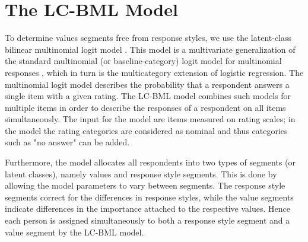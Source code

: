 \documentclass[12pt,letter]{article}\usepackage[]{graphicx}\usepackage[]{xcolor}
\begin{document}
\section*{The LC-BML Model}

To determine values segments free from response styles, we use the latent-class bilinear multinomial logit model \citep[LC-BML model;][]{vanrosmalen2010}. This model is a multivariate generalization of the standard multinomial (or baseline-category) logit model for multinomial responses \citep[e.g.][]{agresti2002}, which in turn is the multicategory extension of logistic regression. The multinomial logit model describes the probability that a respondent answers a single item with a given rating. The LC-BML model combines such models for multiple items in order to describe the responses of a respondent on all items simultaneously. The input for the model are items measured on rating scales; in the model the rating categories are considered as nominal and thus categories such as "no answer" can be added.

Furthermore, the model allocates all respondents into two types of segments (or latent classes), namely values and response style segments. This is done by allowing the model parameters to vary between segments. The response style segments correct for the differences in response styles, while the value segments indicate differences in the importance attached to the respective values. Hence each person is assigned simultaneously to both a response style segment and a value segment by the LC-BML model. 
\end{document}
